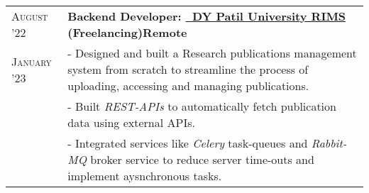 \documentclass[a4paper,10pt]{extarticle} %
\begin{document}
\begin{tabularx}{\linewidth}{ l | X }



\textsc{August '22} & \textbf{Backend Developer: {\href{https://rims.journalchecker.com}{\ DY Patil University RIMS}} (Freelancing)}\hfill\textbf{Remote}\\
\textsc{January '23}& {- Designed and built a Research publications management system from scratch to streamline the process of uploading, accessing and managing publications.}\\
& {- Built \textit{REST-APIs} to automatically fetch publication data using external APIs.}\\
& {- Integrated services like \textit{Celery} task-queues and \textit{Rabbit-MQ} broker service to reduce server time-outs and implement aysnchronous tasks.}\\[2mm]


\end{tabularx}
\end{document}
